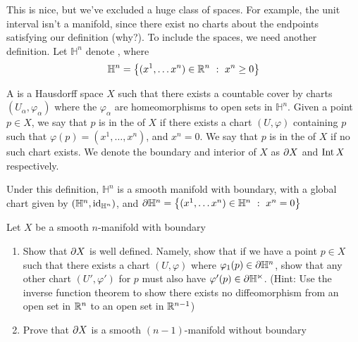 This is nice, but we've excluded a huge class of spaces. For example, the
unit interval isn't a manifold, since there exist no charts about the
endpoints satisfying our definition (why?). To include the spaces, we
need another definition. Let $\mathbb{H}^n$ denote
, where
$$\mathbb{H}^n = \left\lbrace (x^1, \ldots x^n) \in \mathbb{R}^n ~:~ x^n \geq 0 \right\rbrace $$
%
\begin{defn}
	A  is a Hausdorff space $X$ such that there
	exists a countable cover by charts $(U_\alpha, \varphi_\alpha)$ where
	the $\varphi_\alpha$ are homeomorphisms to open sets in $\mathbb{H}^n$.
	Given a point $p \in X$, we say that $p$ is in the  of
	$X$ if there exists a chart $(U, \varphi)$ containing $p$ such that
	$\varphi(p) = (x^1, \ldots, x^n)$, and $x^n = 0$. We say that $p$ is in
	the  of $X$ if no such chart exists. We denote the boundary
	and interior of $X$ as $\partial X$ and $\operatorname{Int} X$ respectively.
\end{defn}
%
Under this definition, $\mathbb{H}^n$ is a smooth manifold with boundary,
with a global chart given by $(\mathbb{H}^n, \operatorname{id}_{\mathbb{H}^n})$, and
$\partial \mathbb{H}^n = \left\lbrace (x^1, \ldots x^n) \in \mathbb{H}^n ~:~ x^n = 0 \right\rbrace$
%
\begin{exer}
	Let $X$ be a smooth $n$-manifold with boundary
	\begin{enumerate}
		\item Show that $\partial X$ is
		well defined. Namely, show that if we have a point $p \in X$ such that
		there exists a chart $(U, \varphi)$ where $\varphi_1(p) \in \partial
		\mathbb{H}^n$, show that any other chart $(U', \varphi')$ for $p$ must
		also have $\varphi'(p) \in \partial \mathbb{H^n}$. (Hint: Use the inverse
		function theorem to show there exists no diffeomorphism from an open set
		in $\mathbb{R}^n$ to an open set in $\mathbb{R}^{n-1}$)
		\item Prove that $\partial X$ is a smooth $(n-1)$-manifold without boundary
	\end{enumerate}
\end{exer}
%
